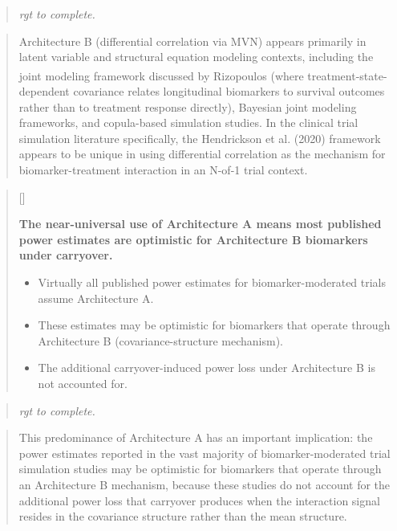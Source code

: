 \documentclass[
  11pt,
]{article}
\newcounter{pgraph}
\newenvironment{bullets}{%
  \stepcounter{pgraph}%
  \begin{quote}\small\sffamily\color[gray]{0.30}%
  {\normalfont\scriptsize\color[gray]{0.58}[\thepgraph]\enspace}}{%
  \end{quote}}
\newenvironment{rgt}{%
  \begin{quote}\small\itshape\color[RGB]{20,60,160}}{%
  \end{quote}}
\newenvironment{orig}{%
  \begin{quote}\normalsize\color[gray]{0.55}}{%
  \end{quote}}
\begin{document}
\begin{rgt}
rgt to complete.

\end{rgt}

\begin{orig}
Architecture B (differential correlation via MVN) appears primarily in
latent variable and structural equation modeling contexts, including the
joint modeling framework discussed by
Rizopoulos\textsuperscript{} (where
treatment-state-dependent covariance relates longitudinal biomarkers to
survival outcomes rather than to treatment response directly), Bayesian
joint modeling frameworks, and copula-based simulation studies. In the
clinical trial simulation literature specifically, the Hendrickson et
al. (2020) framework appears to be unique in using differential
correlation as the mechanism for biomarker-treatment interaction in an
N-of-1 trial context.

\end{orig}

\begin{bullets}

\textbf{The near-universal use of Architecture A means most
published power estimates are optimistic for Architecture B
biomarkers under carryover.}

\begin{itemize}\setlength{\itemsep}{2pt}\setlength{\parskip}{0pt}
\item Virtually all published power estimates for
  biomarker-moderated trials assume Architecture A.
\item These estimates may be optimistic for biomarkers that
  operate through Architecture B (covariance-structure
  mechanism).
\item The additional carryover-induced power loss under
  Architecture B is not accounted for.
\end{itemize}

\end{bullets}

\begin{rgt}
rgt to complete.

\end{rgt}

\begin{orig}
This predominance of Architecture A has an important implication: the
power estimates reported in the vast majority of biomarker-moderated
trial simulation studies may be optimistic for biomarkers that operate
through an Architecture B mechanism, because these studies do not
account for the additional power loss that carryover produces when the
interaction signal resides in the covariance structure rather than the
mean structure.

\end{orig}
\end{document}

